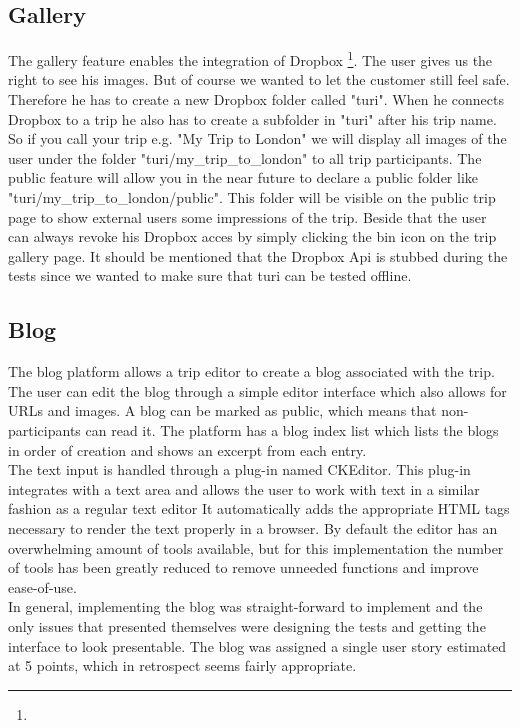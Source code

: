 \documentclass[a4paper]{article}
\begin{document}
\subsection{Gallery}
The gallery feature enables the integration of Dropbox \footnote{\DROPBOX}. The user gives us the right to see his images. But of course we wanted to let the customer still feel safe. Therefore he has to create a new Dropbox folder called "turi". When he connects Dropbox to a trip he also has to create a subfolder in "turi" after his trip name. So if you call your trip e.g. "My Trip to London" we will display all images of the user under the folder "turi/my\_trip\_to\_london" to all trip participants. The public feature will allow you in the near future to declare a public folder like "turi/my\_trip\_to\_london/public". This folder will be visible on the public trip page to show external users some impressions of the trip. Beside that the user can always revoke his Dropbox acces by simply clicking the bin icon on the trip gallery page. It should be mentioned that the Dropbox Api is stubbed during the tests since we wanted to make sure that turi can be tested offline.

\subsection{Blog}
The blog platform allows a trip editor to create a blog associated with the trip. The user can edit the blog through a simple editor interface which also allows for URLs and images. A blog can be marked as public, which means that non-participants can read it. The platform has a blog index list which lists the blogs in order of creation and shows an excerpt from each entry.\\

\noindent
The text input is handled through a plug-in named CKEditor\cite{CKEditor}. This plug-in integrates with a text area and allows the user to work with text in a similar fashion as a regular text editor It automatically adds the appropriate HTML tags necessary to render the text properly in a browser. By default the editor has an overwhelming amount of tools available, but for this implementation the number of tools has been greatly reduced to remove unneeded functions and improve ease-of-use.\\

\noindent
In general, implementing the blog was straight-forward to implement and the only issues that presented themselves were designing the tests and getting the interface to look presentable. The blog was assigned a single user story estimated at 5 points, which in retrospect seems fairly appropriate.
\end{document}
